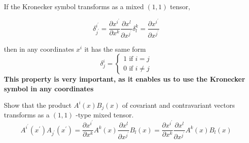 If the Kronecker symbol transforms as a mixed $(1,1)$ tensor,
\begin{qt}
\begin{equation}
\delta_{j^{\prime}}^{i^{\prime}}=\frac{\partial x^{i^{\prime}}}{\partial x^{k}} \frac{\partial x^{l}}{\partial x^{j^{\prime}}} \delta_{l}^{k}=\frac{\partial x^{i^{\prime}}}{\partial x^{j^{\prime}}}
\end{equation}
\end{qt}
then in any coordinates $x^i$ it has the same form 
$$
\delta_{j}^{i}=\left\{\begin{array}{l}
{1 \text { if } i=j} \\
{0 \text { if } i \neq j}
\end{array}\right.
$$
\textbf{This property is very important, as it enables us to use the Kronecker symbol in any coordinates}

\begin{example}
Show that the product $A^{i}(x) B_{j}(x)$ of covariant and contravariant vectors transforms as a $(1,1)$ -type mixed tensor.
$$
A^{i^{\prime}}\left(x^{\prime}\right) A_{j^{\prime}}\left(x^{\prime}\right)=\frac{\partial x^{i^{\prime}}}{\partial x^{k}} A^{k}(x) \frac{\partial x^{l}}{\partial x^{j^{\prime}}} B_{l}(x)=\frac{\partial x^{i^{\prime}}}{\partial x^{k}} \frac{\partial x^{l}}{\partial x^{j^{\prime}}} A^{k}(x) B_{l}(x)
$$
\end{example}

